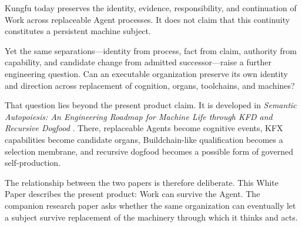 \begin{machinebridgebox}
Kungfu today preserves the identity, evidence, responsibility, and
continuation of Work across replaceable Agent processes. It does not claim that
this continuity constitutes a persistent machine subject.

\medskip
{}
Yet the same separations---identity from process, fact from claim, authority
from capability, and candidate change from admitted successor---raise a
further engineering question. Can an executable organization preserve its own
identity and direction across replacement of cognition, organs, toolchains,
and machines?

That question lies beyond the present product claim. It is developed in
\textit{Semantic Autopoiesis: An Engineering Roadmap for Machine Life through
KFD and Recursive Dogfood} \cite{machineLife}. There, replaceable Agents become
cognitive events, KFX capabilities become candidate organs, Buildchain-like
qualification becomes a selection membrane, and recursive dogfood becomes a
possible form of governed self-production.

The relationship between the two papers is therefore deliberate. This White
Paper describes the present product: Work can survive the Agent. The companion
research paper asks whether the same organization can eventually let a
subject survive replacement of the machinery through which it thinks and
acts.
\end{machinebridgebox}
